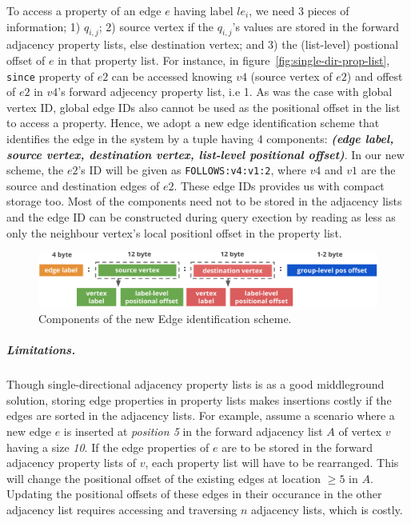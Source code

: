 To access a property of an edge $e$ having label $le_i$, we need 3 pieces of information; 1) $q_{i,j}$; 2) source vertex if the $q_{i,j}$'s values are stored in the forward adjacency property lists, else destination vertex; and 3) the (list-level) postional offset of $e$ in that property list. For instance, in figure~\ref{fig:single-dir-prop-list}, \texttt{since} property of $e2$ can be accessed knowing $v4$ (source vertex of $e2$) and offest of $e2$ in $v4$'s forward adjecency property list, i.e 1. As was the case with global vertex ID, global edge IDs also cannot be used as the positional offset in the list to access a property. Hence, we adopt a new edge identification scheme that identifies the edge in the system by a tuple having 4 components: \textbf{\emph{(edge label, source vertex, destination vertex, list-level positional offset)}}. In our new scheme, the $e2$'s ID will be given as \texttt{FOLLOWS:v4:v1:2}, where $v4$ and $v1$ are the source and destination edges of $e2$. These edge IDs provides us with compact storage too. Most of the components need not to be stored in the adjacency lists and the edge ID can be constructed during query exection by reading as less as only the neighbour vertex's local positionl offset in the property list. 

\begin{figure}
	\vspace{-25pt}
	\hfill\includegraphics[scale=0.78]{img/edge-scheme}\hspace*{\fill}
	\captionsetup{justification=centering}
	\caption{Components of the new Edge identification scheme.}
	\label{fig:edge-scheme}
\end{figure}

\vspace{-12pt}
\subparagraph{Limitations.}Though single-directional adjacency property lists is as a good middleground solution, storing edge properties in property lists makes insertions costly if the edges are sorted in the adjacency lists. For example, assume a scenario where a new edge $e$ is inserted at \emph{position 5} in the forward adjacency list $A$ of vertex $v$ having a size \emph{10}. If the edge properties of $e$ are to be stored in the forward adjacency property lists of $v$, each property list will have to be rearranged. This will change the positional offset of the existing edges at location $\geq5$ in $A$. Updating the positional offsets of these edges in their occurance in the other adjacency list requires accessing and traversing $n$ adjacency lists, which is costly.

